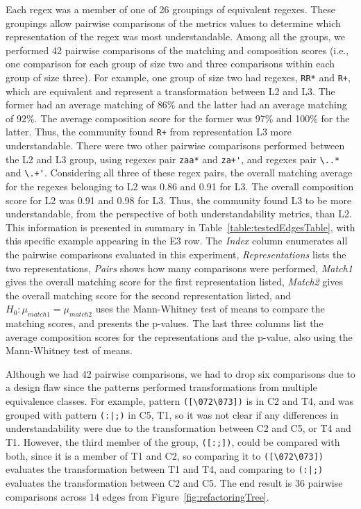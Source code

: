 Each regex was a member of one of 26 groupings of equivalent regexes. These groupings allow pairwise comparisons of the metrics values to determine which representation of the regex was most understandable. Among all the groups, we performed 42 pairwise comparisons of the matching and composition scores  (i.e., one comparison for each group of size two and three comparisons within each group of size three).
For example, one group of size two had regexes, \verb!RR*! and \verb!R+!, which are equivalent and represent a transformation between L2 and L3. The former had an average matching of 86\% and the latter had an average matching of 92\%. The average composition score for the former was 97\% and 100\% for the latter. Thus, the community found \verb!R+! from representation L3 more understandable. There were two other pairwise comparisons performed between the L2 and L3 group, using regexes pair \verb!zaa*! and \verb!za+'!, and regexes pair \verb!\..*! and \verb!\.+'!. Considering all three of these regex pairs, the overall matching average for the regexes belonging to L2 was 0.86 and 0.91 for L3. The overall composition score for L2 was 0.91 and 0.98 for L3. Thus, the community found L3 to be more understandable, from the perspective of both understandability metrics, than L2.
This information is presented in summary in Table~\ref{table:testedEdgesTable}, with this specific example appearing in the E3 row. The \emph{Index} column enumerates all the pairwise comparisons evaluated in this experiment, \emph{Representations} lists the two representations, \emph{Pairs} shows how many comparisons were performed, \emph{Match1} gives the overall matching score for the first representation listed, \emph{Match2} gives the overall matching score for the second representation listed, and $H_0: \mu_{match1} = \mu_{match2}$ uses the Mann-Whitney test of means to compare the matching scores, and presents the p-values. The last three columns list the average composition scores for the representations and the p-value, also using the Mann-Whitney test of means.

%
%
%
%
%


Although we had 42 pairwise comparisons,  we had to drop six comparisons  due to a design flaw since the patterns performed transformations from multiple equivalence classes. For example, pattern \verb!([\072\073])! is in C2 and T4, and was grouped with pattern \verb!(:|;)! in C5, T1, so it was not clear if any differences in understandability were due to the transformation between C2 and C5, or T4 and T1. However, the third member of the group, \verb!([:;])!, could be compared with both, since it is a member of T1 and C2, so comparing it to \verb!([\072\073])! evaluates the transformation between T1 and T4, and comparing to \verb!(:|;)! evaluates the transformation between C2 and C5. The end result is 36 pairwise comparisons across 14 edges from Figure~\ref{fig:refactoringTree}.


